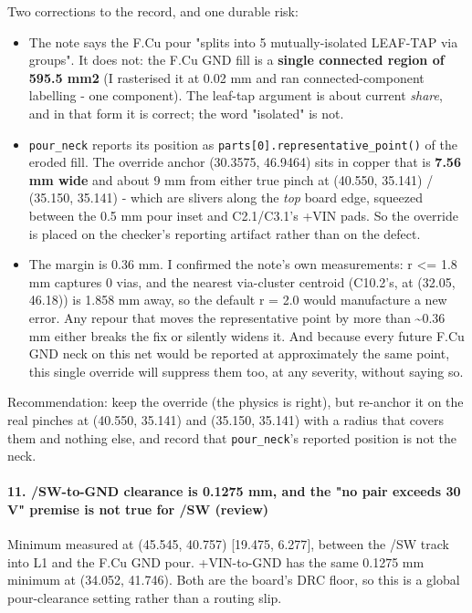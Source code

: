 \documentclass[11pt,a4paper]{article}
\begin{document}
Two corrections to the record, and one durable risk:

\begin{itemize}
\item The note says the F.Cu pour "splits into 5 mutually-isolated LEAF-TAP via groups".
It does not: the F.Cu GND fill is a \textbf{single connected region of 595.5 mm2} (I
rasterised it at 0.02 mm and ran connected-component labelling - one component).
The leaf-tap argument is about current \emph{share}, and in that form it is correct; the
word "isolated" is not.
\item \texttt{pour\_neck} reports its position as \texttt{parts{[}0{]}.representative\_point()} of the eroded
fill. The override anchor (30.3575, 46.9464) sits in copper that is \textbf{7.56 mm wide}
and about 9 mm from either true pinch at (40.550, 35.141) / (35.150, 35.141) - which
are slivers along the \emph{top} board edge, squeezed between the 0.5 mm pour inset and
C2.1/C3.1's +VIN pads. So the override is placed on the checker's reporting artifact
rather than on the defect.
\item The margin is 0.36 mm. I confirmed the note's own measurements: r \textless{}= 1.8 mm captures
0 vias, and the nearest via-cluster centroid (C10.2's, at (32.05, 46.18)) is
1.858 mm away, so the default r = 2.0 would manufacture a new error. Any repour that
moves the representative point by more than \textasciitilde{}0.36 mm either breaks the fix or
silently widens it. And because every future F.Cu GND neck on this net would be
reported at approximately the same point, this single override will suppress them
too, at any severity, without saying so.
\end{itemize}
Recommendation: keep the override (the physics is right), but re-anchor it on the real pinches at (40.550, 35.141) and (35.150, 35.141) with a radius that covers them and nothing else, and record that \texttt{pour\_neck}'s reported position is not the neck.

\paragraph*{11. /SW-to-GND clearance is 0.1275 mm, and the "no pair exceeds 30 V" premise is not true for /SW (review)}
Minimum measured at (45.545, 40.757) {[}19.475, 6.277{]}, between the /SW track into L1 and the F.Cu GND pour. +VIN-to-GND has the same 0.1275 mm minimum at (34.052, 41.746). Both are the board's DRC floor, so this is a global pour-clearance setting rather than a routing slip.
\end{document}
